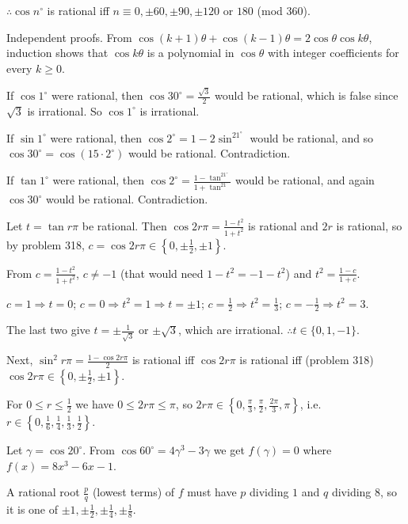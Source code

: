   $\therefore \cos n^\circ$ is rational iff $n\equiv 0, \pm 60, \pm 90, \pm 120$ or $180$ (mod $360$).

  Independent proofs. From $\cos(k + 1)\theta + \cos(k - 1)\theta = 2\cos\theta\cos k\theta$, induction shows that
  $\cos k\theta$ is a polynomial in $\cos\theta$ with integer coefficients for every $k\geq 0$.

  If $\cos1^\circ$ were rational, then $\cos30^\circ = \frac{\sqrt{3}}{2}$ would be rational, which is false since
  $\sqrt{3}$ is irrational. So $\cos1^\circ$ is irrational.

  If $\sin1^\circ$ were rational, then $\cos2^\circ = 1 - 2\sin^21^\circ$ would be rational, and so $\cos30^\circ =
  \cos(15\cdot 2^\circ)$ would be rational. Contradiction.

  If $\tan1^\circ$ were rational, then $\cos2^\circ = \frac{1 - \tan^21^\circ}{1 + \tan^21^\circ}$ would be rational,
  and again $\cos30^\circ$ would be rational. Contradiction.
\item Let $t = \tan r\pi$ be rational. Then $\cos2r\pi = \frac{1 - t^2}{1 + t^2}$ is rational and $2r$ is
  rational, so by problem 318, $c = \cos2r\pi\in\left\{0, \pm\frac{1}{2}, \pm 1\right\}$.

  From $c = \frac{1 - t^2}{1 + t^2}$, $c\neq -1$ (that would need $1 - t^2 = -1 - t^2$) and $t^2 = \frac{1 -
    c}{1 + c}$.

  $c = 1\Rightarrow t = 0$; $c = 0\Rightarrow t^2 = 1\Rightarrow t = \pm 1$; $c = \frac{1}{2}\Rightarrow t^2
  = \frac{1}{3}$; $c = -\frac{1}{2}\Rightarrow t^2 = 3$.

  The last two give $t = \pm\frac{1}{\sqrt{3}}$ or $\pm\sqrt{3}$, which are irrational. $\therefore t\in\{0, 1,
  -1\}$.

  Next, $\sin^2r\pi = \frac{1 - \cos2r\pi}{2}$ is rational iff $\cos2r\pi$ is rational iff (problem 318)
  $\cos2r\pi\in\left\{0, \pm\frac{1}{2}, \pm1\right\}$.

  For $0\leq r\leq\frac{1}{2}$ we have $0\leq 2r\pi\leq\pi$, so $2r\pi\in\left\{0, \frac{\pi}{3},
  \frac{\pi}{2}, \frac{2\pi}{3}, \pi\right\}$, i.e.\ $r\in\left\{0, \frac{1}{6}, \frac{1}{4}, \frac{1}{3},
  \frac{1}{2}\right\}$.
\item Let $\gamma = \cos20^\circ$. From $\cos60^\circ = 4\gamma^3 - 3\gamma$ we get $f(\gamma) = 0$ where $f(x) = 8x^3 - 6x - 1$.

  A rational root $\frac{p}{q}$ (lowest terms) of $f$ must have $p$ dividing $1$ and $q$ dividing $8$, so it is one of $\pm 1,
  \pm\frac{1}{2}, \pm\frac{1}{4}, \pm\frac{1}{8}$.

